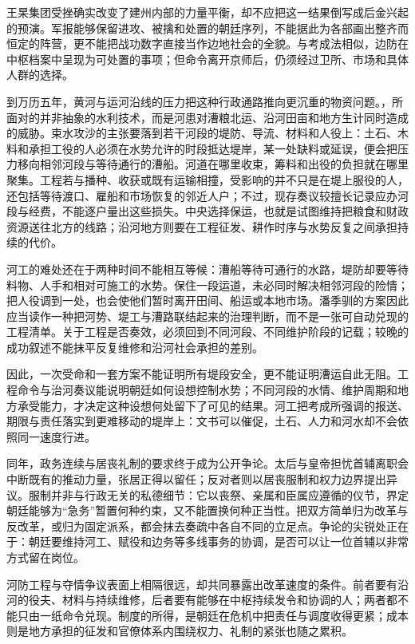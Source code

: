 王杲集团受挫确实改变了建州内部的力量平衡，却不应把这一结果倒写成后金兴起的预演。军报能够保留进攻、被擒和处置的朝廷序列，不能据此为各部画出整齐而恒定的阵营，更不能把战功数字直接当作边地社会的全貌。与考成法相似，边防在中枢档案中呈现为可处置的事项；但命令离开京师后，仍须经过卫所、市场和具体人群的选择。

到万历五年，黄河与运河沿线的压力把这种行政通路推向更沉重的物资问题。，所面对的并非抽象的水利技术，而是河患对漕粮北运、沿河田亩和地方生计同时造成的威胁。束水攻沙的主张要落到若干河段的堤防、导流、材料和人役上：土石、木料和承担工役的人必须在水势允许的时段抵达堤岸，某一处缺料或延误，便会把压力移向相邻河段与等待通行的漕船。河道在哪里收束，筹料和出役的负担就在哪里聚集。工程若与播种、收获或既有运输相撞，受影响的并不只是在堤上服役的人，还包括等待渡口、雇船和市场恢复的邻近人户；不过，现存奏议较擅长记录应办河段与经费，不能逐户量出这些损失。中央选择保运，也就是试图维持把粮食和财政资源送往北方的线路；沿河地方则要在工程征发、耕作时序与水势反复之间承担持续的代价。

河工的难处还在于两种时间不能相互等候：漕船等待可通行的水路，堤防却要等待料物、人手和相对可施工的水势。保住一段运道，未必同时解决相邻河段的险情；把人役调到一处，也会使他们暂时离开田间、船运或本地市场。潘季驯的方案因此应当读作一种把河势、堤工与漕路联结起来的治理判断，而不是一张可自动兑现的工程清单。关于工程是否奏效，必须回到不同河段、不同维护阶段的记载；较晚的成功叙述不能抹平反复维修和沿河社会承担的差别。

因此，一次受命和一套方案不能证明所有堤段安全，更不能证明漕运自此无阻。工程命令与治河奏议能说明朝廷如何设想控制水势；不同河段的水情、维护周期和地方承受能力，才决定这种设想何处留下了可见的结果。河工把考成所强调的报送、期限与责任落实到更难移动的堤岸上：文书可以催促，土石、人力和河水却不会依照同一速度行进。

同年，政务连续与居丧礼制的要求终于成为公开争论。太后与皇帝担忧首辅离职会中断既有的推动力量，张居正得以留任；反对者则以居丧服制和权力边界提出异议。服制并非与行政无关的私德细节：它以丧祭、亲属和臣属应遵循的仪节，界定朝廷能够为“急务”暂置何种约束，又不能置换何种正当性。把双方简单归为改革与反改革，或归为固定派系，都会抹去奏疏中各自不同的立足点。争论的尖锐处正在于：朝廷要维持河工、赋役和边务等多线事务的协调，是否可以让一位首辅以非常方式留在岗位。

河防工程与夺情争议表面上相隔很远，却共同暴露出改革速度的条件。前者要有沿河的役夫、材料与持续维修，后者要有能够在中枢持续发令和协调的人；两者都不能只由一纸命令兑现。制度的所得，是朝廷在危机中把责任与调度收得更紧；成本则是地方承担的征发和官僚体系内围绕权力、礼制的紧张也随之累积。


